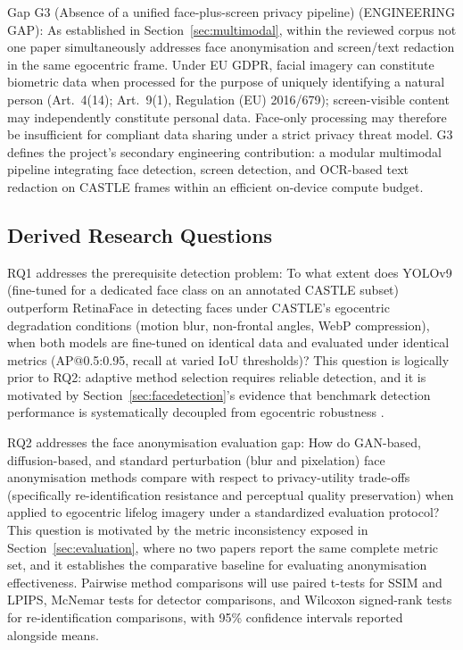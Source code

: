 \documentclass[12pt, onecolumn]{IEEEtran}
\begin{document}
Gap G3 (Absence of a unified face-plus-screen privacy pipeline)
(ENGINEERING GAP): As established in Section~\ref{sec:multimodal}, within
the reviewed corpus not one paper simultaneously addresses face
anonymisation and screen/text redaction in the same egocentric frame.
Under EU GDPR, facial imagery can constitute biometric data when
processed for the purpose of uniquely identifying a natural person
(Art.~4(14); Art.~9(1), Regulation (EU) 2016/679); screen-visible
content may independently constitute personal data. Face-only processing
may therefore be insufficient for compliant data sharing under a strict
privacy threat model. G3 defines the project's secondary engineering
contribution: a modular multimodal pipeline integrating face detection,
screen detection, and OCR-based text redaction on CASTLE frames within
an efficient on-device compute budget.

\subsection{Derived Research Questions}

RQ1 addresses the prerequisite detection problem: To what extent does
YOLOv9 (fine-tuned for a dedicated face class on an annotated CASTLE
subset) outperform RetinaFace in detecting faces under CASTLE's
egocentric degradation conditions (motion blur, non-frontal angles, WebP
compression), when both models are fine-tuned on identical data and
evaluated under identical metrics (AP@0.5:0.95, recall at varied IoU
thresholds)? This question is logically prior to RQ2: adaptive method
selection requires reliable detection, and it is motivated by
Section~\ref{sec:facedetection}'s evidence that benchmark detection performance
is systematically decoupled from egocentric robustness
\cite{deng2020retinaface, wang2024yolov9}.

RQ2 addresses the face anonymisation evaluation gap: How do GAN-based, diffusion-based, and standard perturbation (blur and pixelation) face anonymisation methods compare with respect to privacy-utility trade-offs (specifically re-identification resistance and perceptual quality preservation) when applied to egocentric lifelog imagery under a standardized evaluation protocol? This question is motivated by the metric inconsistency exposed in Section~\ref{sec:evaluation}, where no two papers report the same complete metric set, and it establishes the comparative baseline for evaluating anonymisation effectiveness.
Pairwise method comparisons will use paired t-tests for SSIM and LPIPS, McNemar tests for detector comparisons, and Wilcoxon signed-rank tests for re-identification comparisons, with 95\% confidence intervals reported alongside means.
\end{document}
